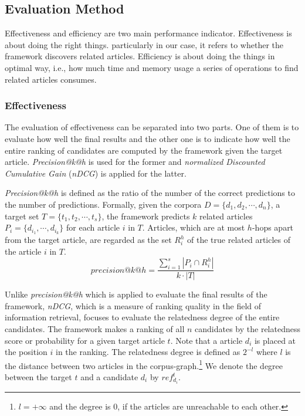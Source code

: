 \subsection{Evaluation Method}

Effectiveness and efficiency are two main performance indicator. Effectiveness is about doing the right things. particularly in our case, it refers to whether the framework discovers related articles. Efficiency is about doing the things in optimal way, i.e., how much time and memory usage a series of operations to find related articles consumes. 

\subsubsection{Effectiveness}

The evaluation of effectiveness can be separated into two parts. One of them is to evaluate how well the final results and the other one is to indicate how well the entire ranking of candidates are computed by the framework given the target article. \textit{Precision@k@h} is used for the former and \textit{normalized Discounted Cumulative Gain} (\textit{nDCG}) is applied for the latter. 

\textit{Precision@k@h} is defined as the ratio of the number of the correct predictions to the number of predictions. Formally, given the corpora $D = \{d_1, d_2, \cdots, d_n\}$, a target set $T = \{t_1, t_2, \cdots, t_s\}$, the framework predicts $k$ related articles $P_i = \{d_{i_1}, \cdots, d_{i_k}\}$ for each article $i$ in $T$. Articles, which are at most $h$-hops apart from the target article, are regarded as the set $R_i^h$ of the true related articles of the article $i$ in $T$. 
\begin{equation}
    precision@k@h = \frac{\sum_{i=1}^s{|P_i \cap R_i^h|}}{k \cdot |T|}
\end{equation}

Unlike \textit{precision@k@h} which is applied to evaluate the final results of the framework, \textit{nDCG}, which is a measure of ranking quality in the field of information retrieval, focuses to evaluate the relatedness degree of the entire candidates. The framework makes a ranking of all $n$ candidates by the relatedness score or probability for a given target article $t$. Note that a article $d_i$ is placed at the position $i$ in the ranking. The relatedness degree is defined as $2^{-l}$ where $l$ is the distance between two articles in the corpus-graph.\footnote{$l=+\infty$ and the degree is $0$, if the articles are unreachable to each other.} We denote the degree between the target $t$ and a candidate $d_i$ by $ref_{d_i}^t$.

